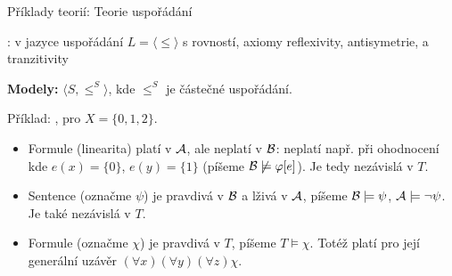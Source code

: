 \documentclass{beamer}
\begin{document}
\begin{frame}{Příklady teorií: Teorie uspořádání}

    \pause
    : v jazyce uspořádání $L=\langle\leq\rangle$ s rovností, axiomy \alert{reflexivity}, \alert{antisymetrie}, a \alert{tranzitivity}

    \pause

    \pause
    \textbf{Modely:} $\langle S,\leq^S\rangle$, kde $\leq^S$ je \alert{částečné uspořádání}. 
    
    \pause
    Příklad: ,  pro $X=\{0,1,2\}$.\pause
    \begin{itemize}
        \item Formule  (\alert{linearita}) platí v $\mathcal{A}$, ale neplatí v $\mathcal{B}$: neplatí např. při ohodnocení kde $e(x)=\{0\}$, $e(y)=\{1\}$ (píšeme $\mathcal{B}\not\models\varphi[e]$). Je tedy nezávislá v $T$.\pause
        \item Sentence  (označme $\psi$) je pravdivá v $\mathcal{B}$ a lživá v $\mathcal{A}$, píšeme $\mathcal{B}\models\psi$, $\mathcal{A}\models\neg\psi$. Je také nezávislá v $T$.\pause
        \item Formule  (označme  $\chi$) je pravdivá v $T$, píšeme $T\models\chi$. \pause 
         Totéž platí pro její \alert{generální uzávěr} $(\forall x)(\forall y)(\forall z)\chi$.
    \end{itemize}

\end{frame}
\end{document}
